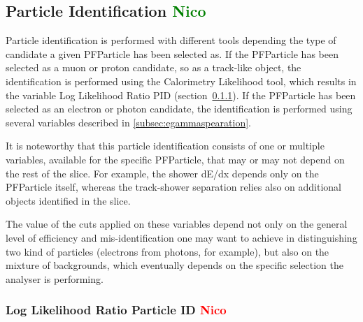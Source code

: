 \documentclass[a4paper]{article}
\begin{document}
\subsection{Particle Identification \textcolor{green}{Nico}}
Particle identification is performed with different tools depending the type of candidate a given PFParticle has been selected as.
If the PFParticle has been selected as a muon or proton candidate, so as a track-like object, the identification is performed using the Calorimetry Likelihood tool, which results in the variable Log Likelihood Ratio PID  (section~\ref{subsec:loglikelihoodpid}).
If the PFParticle has been selected as an electron or photon candidate, the identification is performed using several variables described in \ref{subsec:egammaspearation}.

It is noteworthy that this particle identification consists of one or multiple variables, available for the specific PFParticle, that may or may not depend on the rest of the slice. 
For example, the shower dE/dx depends only on the PFParticle itself, whereas the track-shower separation relies also on additional objects identified in the slice.

The value of the cuts applied on these variables depend not only on the general level of efficiency and mis-identification one may want to achieve in distinguishing two kind of particles (electrons from photons, for example), but also on the mixture of backgrounds, which eventually depends on the specific selection the analyser is performing.

\subsubsection{Log Likelihood Ratio Particle ID \textcolor{red}{Nico}}
\label{subsec:loglikelihoodpid}
\end{document}
